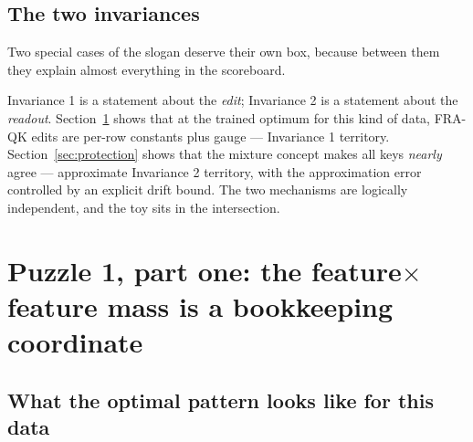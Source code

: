 \documentclass{article}
\begin{document}
\subsection{The two invariances}\label{sec:invariances}

Two special cases of the slogan deserve their own box, because between them they explain almost everything in the scoreboard.

\begin{center}
\end{center}

Invariance 1 is a statement about the \emph{edit}; Invariance 2 is a statement about the \emph{readout}. Section~\ref{sec:gauge} shows that at the trained optimum for this kind of data, FRA-QK edits are per-row constants plus gauge --- Invariance 1 territory. Section~\ref{sec:protection} shows that the mixture concept makes all keys \emph{nearly} agree --- approximate Invariance 2 territory, with the approximation error controlled by an explicit drift bound. The two mechanisms are logically independent, and the toy sits in the intersection.

\section{Puzzle 1, part one: the feature$\times$feature mass is a bookkeeping coordinate}\label{sec:gauge}

\subsection{What the optimal pattern looks like for this data}
\end{document}

